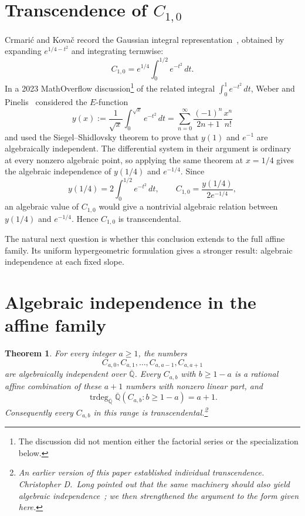 \documentclass[12pt]{article}
\newtheorem{theorem}{Theorem}[section]
\begin{document}
\section{Transcendence of \texorpdfstring{$C_{1,0}$}{C(1,0)}}
\label{sec:a1-transcendence}

Crmari\'c and Kova\v{c} record the Gaussian integral representation~\cite[p.~55 and footnote~1]{crmaric-kovac}, obtained by expanding $e^{1/4-t^2}$ and integrating termwise:
\[
C_{1,0}=e^{1/4}\int_0^{1/2}e^{-t^2}\,dt.
\tag{1}
\]
In a 2023 MathOverflow discussion\footnote{The discussion did not mention either the factorial series or the specialization below.} of the related integral $\int_0^1e^{-t^2}\,dt$, Weber and Pinelis~\cite{mathoverflow} considered the $E$-function
\[
y(x):=\frac1{\sqrt{x}}\int_0^{\sqrt{x}}e^{-t^2}\,dt
=\sum_{n=0}^{\infty}\frac{(-1)^n}{2n+1}\frac{x^n}{n!}
\]
and used the Siegel--Shidlovsky theorem to prove that $y(1)$ and $e^{-1}$ are algebraically independent. The differential system in their argument is ordinary at every nonzero algebraic point, so applying the same theorem at $x=1/4$ gives the algebraic independence of $y(1/4)$ and $e^{-1/4}$. Since
\[
y(1/4)=2\int_0^{1/2}e^{-t^2}\,dt,
\qquad
C_{1,0}=\frac{y(1/4)}{2e^{-1/4}},
\]
an algebraic value of $C_{1,0}$ would give a nontrivial algebraic relation between $y(1/4)$ and $e^{-1/4}$. Hence $C_{1,0}$ is transcendental.

The natural next question is whether this conclusion extends to the full affine family. Its uniform hypergeometric formulation gives a stronger result: algebraic independence at each fixed slope.

\section{Algebraic independence in the affine family}
\label{sec:affine-family}

\begin{theorem}
\label{thm:main}
For every integer $a\geq1$, the numbers
\[
C_{a,0},C_{a,1},\ldots,C_{a,a-1},C_{a,a+1}
\]
are algebraically independent over $\overline{\mathbb Q}$. Every $C_{a,b}$ with $b\geq1-a$ is a rational affine combination of these $a+1$ numbers with nonzero linear part, and
\[
\operatorname{trdeg}_{\overline{\mathbb Q}}
\overline{\mathbb Q}(C_{a,b}:b\geq1-a)=a+1.
\]
Consequently every $C_{a,b}$ in this range is transcendental.\footnote{An earlier version of this paper established individual transcendence. Christopher D.~Long pointed out that the same machinery should also yield algebraic independence~\cite{long-x}; we then strengthened the argument to the form given here.}
\end{theorem}
\end{document}
